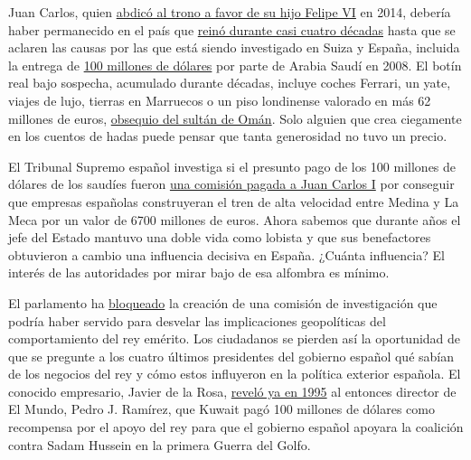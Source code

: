 Juan Carlos, quien
\href{https://www.nytimes3xbfgragh.onion/2014/06/12/world/europe/spanish-lawmakers-clear-way-for-kings-abdication.html}{abdicó
al trono a favor de su hijo Felipe VI} en 2014, debería haber
permanecido en el país que
\href{https://www.nytimes3xbfgragh.onion/slideshow/2014/06/19/blogs/20140619KING/s/20140619KING-slide-DNFH.html}{reinó
durante casi cuatro décadas} hasta que se aclaren las causas por las que
está siendo investigado en Suiza y España, incluida la entrega de
\href{https://www.eldiario.es/politica/millones-juan-carlos-cronologia-retrata_1_1027438.html}{100
millones de dólares} por parte de Arabia Saudí en 2008. El botín real
bajo sospecha, acumulado durante décadas, incluye coches Ferrari, un
yate, viajes de lujo, tierras en Marruecos o un piso londinense valorado
en más 62 millones de euros,
\href{https://www.publico.es/politica/juan-carlos-i-recibio-atico-londres-abdicar-comprado-oman-luego-revendio.html}{obsequio
del sultán de Omán}. Solo alguien que crea ciegamente en los cuentos de
hadas puede pensar que tanta generosidad no tuvo un precio.

El Tribunal Supremo español investiga si el presunto pago de los 100
millones de dólares de los saudíes fueron
\href{https://www.bbc.com/news/world-europe-52977739}{una comisión
pagada a Juan Carlos I} por conseguir que empresas españolas
construyeran el tren de alta velocidad entre Medina y La Meca por un
valor de 6700 millones de euros. Ahora sabemos que durante años el jefe
del Estado mantuvo una doble vida como lobista y que sus benefactores
obtuvieron a cambio una influencia decisiva en España. ¿Cuánta
influencia? El interés de las autoridades por mirar bajo de esa alfombra
es mínimo.

El parlamento ha
\href{https://www.lavanguardia.com/politica/20200616/481814522302/mesa-ongreso-rechaza-investigar-juan-carlos-i.html}{bloqueado}
la creación de una comisión de investigación que podría haber servido
para desvelar las implicaciones geopolíticas del comportamiento del rey
emérito. Los ciudadanos se pierden así la oportunidad de que se pregunte
a los cuatro últimos presidentes del gobierno español qué sabían de los
negocios del rey y cómo estos influyeron en la política exterior
española. El conocido empresario, Javier de la Rosa,
\href{https://www.elespanol.com/opinion/carta-del-director/20200322/matar-padre-hora-negra/476652332_20.html}{reveló
ya en 1995} al entonces director de El Mundo, Pedro J. Ramírez, que
Kuwait pagó 100 millones de dólares como recompensa por el apoyo del rey
para que el gobierno español apoyara la coalición contra Sadam Hussein
en la primera Guerra del Golfo.

